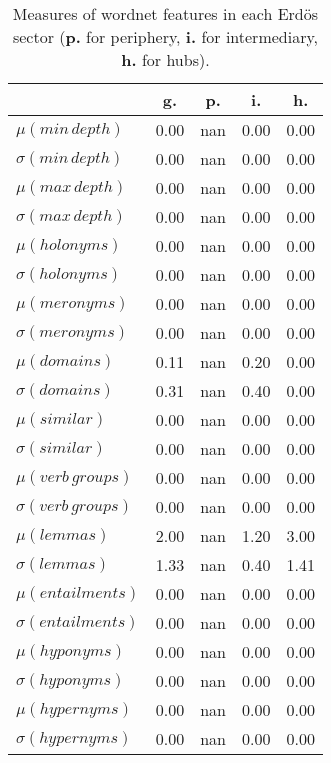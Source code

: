 \begin{table}[h!]
\begin{center}
\begin{tabular}{| l || c | c | c | c |}\hline
 & {\bf g.} & {\bf p.} & {\bf i.} & {\bf h.} \\\hline\hline
$\mu(min\,depth)$ & 0.00  & nan  & 0.00  & 0.00 \\
$\sigma(min\,depth)$ & 0.00  & nan  & 0.00  & 0.00 \\\hline
$\mu(max\,depth)$ & 0.00  & nan  & 0.00  & 0.00 \\
$\sigma(max\,depth)$ & 0.00  & nan  & 0.00  & 0.00 \\\hline
$\mu(holonyms)$ & 0.00  & nan  & 0.00  & 0.00 \\
$\sigma(holonyms)$ & 0.00  & nan  & 0.00  & 0.00 \\\hline
$\mu(meronyms)$ & 0.00  & nan  & 0.00  & 0.00 \\
$\sigma(meronyms)$ & 0.00  & nan  & 0.00  & 0.00 \\\hline
$\mu(domains)$ & 0.11  & nan  & 0.20  & 0.00 \\
$\sigma(domains)$ & 0.31  & nan  & 0.40  & 0.00 \\\hline
$\mu(similar)$ & 0.00  & nan  & 0.00  & 0.00 \\
$\sigma(similar)$ & 0.00  & nan  & 0.00  & 0.00 \\\hline
$\mu(verb\,groups)$ & 0.00  & nan  & 0.00  & 0.00 \\
$\sigma(verb\,groups)$ & 0.00  & nan  & 0.00  & 0.00 \\\hline
$\mu(lemmas)$ & 2.00  & nan  & 1.20  & 3.00 \\
$\sigma(lemmas)$ & 1.33  & nan  & 0.40  & 1.41 \\\hline
$\mu(entailments)$ & 0.00  & nan  & 0.00  & 0.00 \\
$\sigma(entailments)$ & 0.00  & nan  & 0.00  & 0.00 \\\hline
$\mu(hyponyms)$ & 0.00  & nan  & 0.00  & 0.00 \\
$\sigma(hyponyms)$ & 0.00  & nan  & 0.00  & 0.00 \\\hline
$\mu(hypernyms)$ & 0.00  & nan  & 0.00  & 0.00 \\
$\sigma(hypernyms)$ & 0.00  & nan  & 0.00  & 0.00 \\\hline
\end{tabular}
\caption{Measures of wordnet features in each Erd\"os sector ({{\bf p.}} for periphery, {{\bf i.}} for intermediary, {{\bf h.}} for hubs).}
\end{center}
\end{table}
